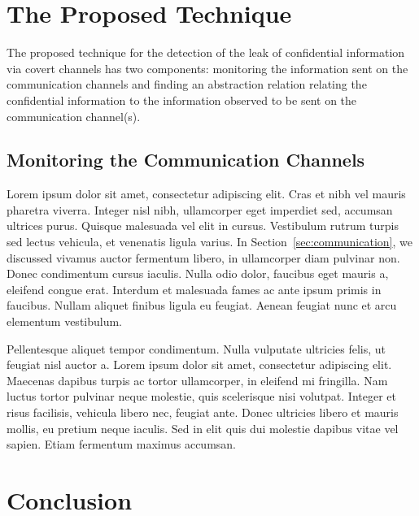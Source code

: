 
\section{The Proposed Technique}
\label{sec:the_proposed_technique}

The proposed technique for the detection of the leak of confidential information via covert channels has two components: monitoring the information sent on the communication channels and finding an abstraction relation relating the confidential information to the information observed to be sent on the communication channel(s).

\subsection{Monitoring the Communication Channels}
\label{sub:monitoring_the_communication_channels}

Lorem ipsum dolor sit amet, consectetur adipiscing elit. Cras et nibh vel mauris pharetra viverra. Integer nisl nibh, ullamcorper eget imperdiet sed, accumsan ultrices purus. Quisque malesuada vel elit in cursus. Vestibulum rutrum turpis sed lectus vehicula, et venenatis ligula varius.  In Section~\ref{sec:communication}, we discussed vivamus auctor fermentum libero, in ullamcorper diam pulvinar non. Donec condimentum cursus iaculis. Nulla odio dolor, faucibus eget mauris a, eleifend congue erat. Interdum et malesuada fames ac ante ipsum primis in faucibus. Nullam aliquet finibus ligula eu feugiat. Aenean feugiat nunc et arcu elementum vestibulum. \newline



Pellentesque aliquet tempor condimentum. Nulla vulputate ultricies felis, ut feugiat nisl auctor a. Lorem ipsum dolor sit amet, consectetur adipiscing elit. Maecenas dapibus turpis ac tortor ullamcorper, in eleifend mi fringilla. Nam luctus tortor pulvinar neque molestie, quis scelerisque nisi volutpat. Integer et risus facilisis, vehicula libero nec, feugiat ante. Donec ultricies libero et mauris mollis, eu pretium neque iaculis. Sed in elit quis dui molestie dapibus vitae vel sapien. Etiam fermentum maximus accumsan.


\section{Conclusion}
\label{sec:problem_formulation_conclusion}

